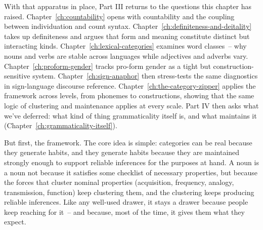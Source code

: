 With that apparatus in place, Part III returns to the questions this chapter has raised. Chapter~\ref{ch:countability} opens with countability and the coupling between individuation and count syntax. Chapter~\ref{ch:definiteness-and-deitality} takes up definiteness and argues that form and meaning constitute distinct but interacting kinds. Chapter~\ref{ch:lexical-categories} examines word classes~-- why nouns and verbs are stable across languages while adjectives and adverbs vary. Chapter~\ref{ch:proform-gender} tracks pro-form gender as a tight but construction-sensitive system. Chapter~\ref{ch:sign-anaphor} then stress-tests the same diagnostics in sign-language discourse reference. Chapter~\ref{ch:the-category-zipper} applies the framework across levels, from phonemes to constructions, showing that the same logic of clustering and maintenance applies at every scale. Part IV then asks what we've deferred: what kind of thing grammaticality itself is, and what maintains it (Chapter~\ref{ch:grammaticality-itself}).

But first, the framework. The core idea is simple: categories can be real because they generate habits, and they generate habits because they are maintained strongly enough to support reliable inferences for the purposes at hand. A noun is a noun not because it satisfies some checklist of necessary properties, but because the forces that cluster nominal properties (acquisition, frequency, analogy, transmission, function) keep clustering them, and the clustering keeps producing reliable inferences.
Like any well-used drawer, it stays a drawer because people keep reaching for it~-- and because, most of the time, it gives them what they expect.
